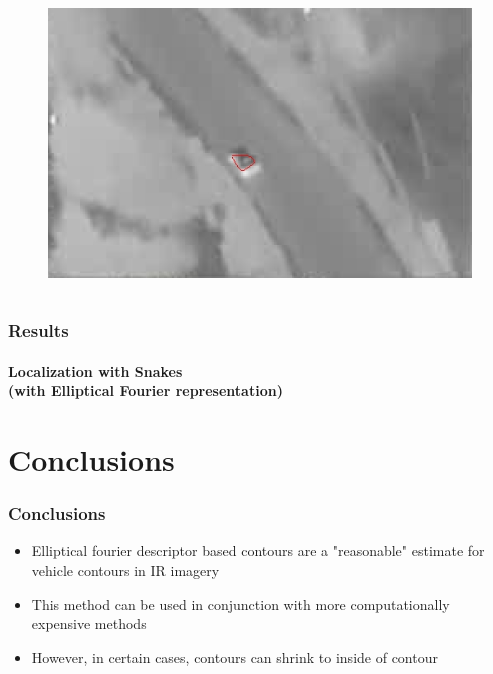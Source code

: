 \begin{frame}
\begin{columns}
\begin{column}{1in}
\begin{figure}
			\end{figure}
			\begin{figure}
				\includegraphics[width=1.5\textwidth]{figs/TRK_IGARSS2010_01277_contour.jpg}
			\end{figure}
		\end{column}			
	\end{columns}
\end{frame}




\begin{frame}
\frametitle{Results}
\framesubtitle{Localization with Snakes \\{\small(with Elliptical Fourier representation)}}
\logoCSIPCPL\mypagenum
\end{frame}


\section{Conclusions}

\begin{frame}
\frametitle{Conclusions}
\logoCSIPCPL\mypagenum
	\begin{itemize}
		\item Elliptical fourier descriptor based contours are a "reasonable" estimate for vehicle contours in IR imagery
		\item This method can be used in conjunction with more computationally expensive methods
		\item However, in certain cases, contours can shrink to inside of contour
	\end{itemize}
\end{frame}







